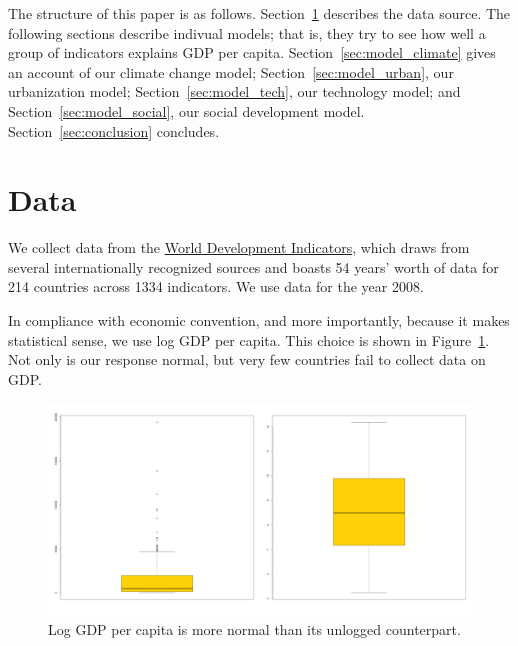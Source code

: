 \documentclass[11pt]{article}
\begin{document}
The structure of this paper is as follows.
Section~\ref{sec:data} describes the data source.
The following sections describe indivual models; that is, they try to see how well a group of indicators explains GDP per capita.
Section~\ref{sec:model_climate} gives an account of our climate change model;
Section~\ref{sec:model_urban}, our urbanization model;
Section~\ref{sec:model_tech}, our technology model; and
Section~\ref{sec:model_social}, our social development model.
Section~\ref{sec:conclusion} concludes.






\section{Data}
\label{sec:data}
We collect data from the \href{http://data.worldbank.org/indicator}{World Development Indicators}, 
which draws from several internationally recognized sources and boasts 54 years' worth of data for 214 countries across 1334 indicators.
We use data for the year 2008.\endnotemark[1]

In compliance with economic convention, and more importantly, because it makes statistical sense, we use log GDP per capita. This choice is shown in Figure~\ref{gdp_transform}.
Not only is our response normal, but very few countries fail to collect data on GDP.

\begin{figure}[!ht]
  \centering
  \includegraphics[width=\textwidth]{images/gdp_transform}
  \caption{\label{gdp_transform}Log GDP per capita is more normal than its unlogged counterpart.}
\end{figure}
\end{document}
